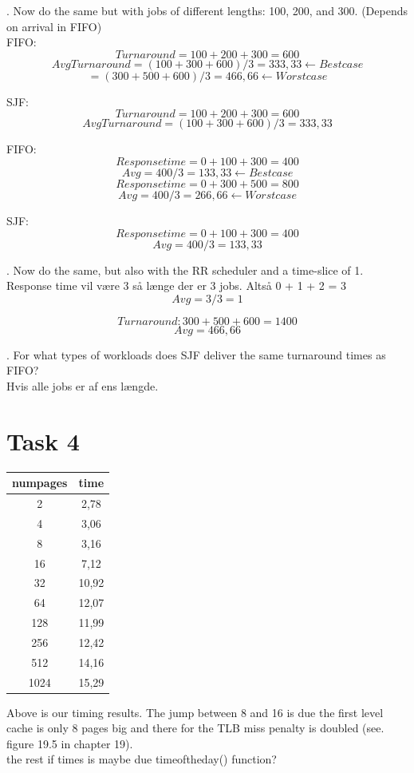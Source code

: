 \documentclass[12pt]{article}
\begin{document}
. Now do the same but with jobs of different lengths: 100, 200, and 300.      (Depends on arrival in FIFO)\\

\noindent FIFO: 
$$Turnaround = 100 + 200 + 300 = 600$$     $$AvgTurnaround = (100 + 300 + 600) / 3 = 333,33     \leftarrow Best case$$
							   $$= (300 + 500 + 600) / 3 = 466,66     \leftarrow Worst case$$

\noindent SJF:
$$Turnaround = 100 + 200 + 300 = 600$$     $$AvgTurnaround = (100 + 300 + 600) / 3 = 333,33$$

\noindent FIFO: 
$$Response time = 0 + 100 + 300 = 400$$    $$Avg = 400/3 = 	133,33     \leftarrow Best case$$
      $$Response time = 0 + 300 + 500 = 800$$    $$Avg = 400/3 = 	266,66     \leftarrow Worst case$$
							   
\noindent SJF:  
$$Response time = 0 + 100 + 300 = 400$$    $$Avg = 400/3 = 	133,33$$


. Now do the same, but also with the RR scheduler and a time-slice of 1.\\
Response time vil være 3 så længe der er 3 jobs. Altså 0 + 1 + 2 = 3         
$$Avg = 3 / 3 = 1$$

$$Turnaround: 300 + 500 + 600 = 1400$$        $$Avg = 466,66$$

. For what types of workloads does SJF deliver the same turnaround times as FIFO?\\
Hvis alle jobs er af ens længde.


\section*{Task 4}

\begin{tabular}{|c|c|}
  \hline
  numpages & time\\
  \hline
  2 & 2,78\\
  4 & 3,06\\
  8 & 3,16\\
  16 & 7,12\\
  32 & 10,92\\
  64 & 12,07\\
  128 & 11,99\\
  256 & 12,42\\
  512 & 14,16\\
  1024 & 15,29\\
  \hline
\end{tabular}
Above is our timing results. The jump between 8 and 16 is due the first level cache is only 8 pages big and there for the TLB miss penalty is doubled (see. figure 19.5 in chapter 19).\\
the rest if times is maybe due timeoftheday() function? 
\end{document}
